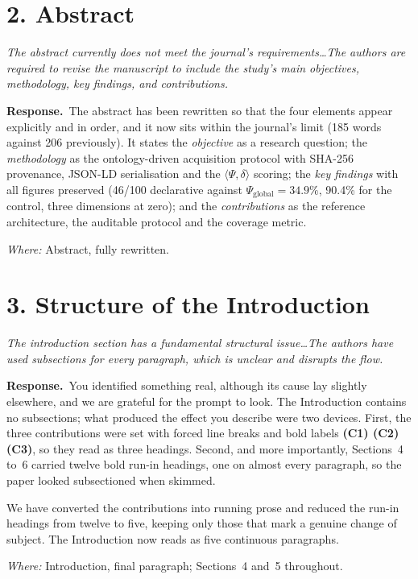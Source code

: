 \documentclass[11pt,a4paper]{article}
\newenvironment{comment}
  {\begin{mdframed}[backgroundcolor=cmtbg, linecolor=cmtrule, linewidth=0.6pt,
     innertopmargin=5pt, innerbottommargin=5pt, innerleftmargin=7pt,
     innerrightmargin=7pt, skipabove=4pt, skipbelow=6pt]\itshape}
  {\end{mdframed}}
\newcommand{\resp}{\par\noindent\textbf{Response.}\ }
\newcommand{\done}[1]{\par\vspace{2pt}\noindent\textit{Where:} #1\par\vspace{4pt}}
\begin{document}
\section*{2. Abstract}
\begin{comment}
The abstract currently does not meet the journal's requirements\dots The authors are required to revise the manuscript to include the study's main objectives, methodology, key findings, and contributions.
\end{comment}
\resp The abstract has been rewritten so that the four elements appear explicitly and in order, and it now sits within the journal's limit (185 words against 206 previously). It states the \emph{objective} as a research question; the \emph{methodology} as the ontology-driven acquisition protocol with SHA-256 provenance, JSON-LD serialisation and the $\langle\Psi,\delta\rangle$ scoring; the \emph{key findings} with all figures preserved (46/100 declarative against $\Psi_{\mathrm{global}}=34.9\%$, 90.4\% for the control, three dimensions at zero); and the \emph{contributions} as the reference architecture, the auditable protocol and the coverage metric.
\done{Abstract, fully rewritten.}

\section*{3. Structure of the Introduction}
\begin{comment}
The introduction section has a fundamental structural issue\dots The authors have used subsections for every paragraph, which is unclear and disrupts the flow.
\end{comment}
\resp You identified something real, although its cause lay slightly elsewhere, and we are grateful for the prompt to look. The Introduction contains no subsections; what produced the effect you describe were two devices. First, the three contributions were set with forced line breaks and bold labels \textbf{(C1) (C2) (C3)}, so they read as three headings. Second, and more importantly, Sections~4 to~6 carried twelve bold run-in headings, one on almost every paragraph, so the paper looked subsectioned when skimmed.

We have converted the contributions into running prose and reduced the run-in headings from twelve to five, keeping only those that mark a genuine change of subject. The Introduction now reads as five continuous paragraphs.
\done{Introduction, final paragraph; Sections~4 and~5 throughout.}
\end{document}
